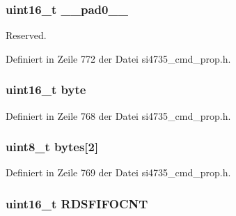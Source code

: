 \subsubsection[{\+\_\+\+\_\+pad0\+\_\+\+\_\+}]{\setlength{\rightskip}{0pt plus 5cm}uint16\+\_\+t \+\_\+\+\_\+pad0\+\_\+\+\_\+}\label{unionfm__rds__int__fifo__count_a77132c2c26a75f5b8751b235cda23828}


Reserved. 



Definiert in Zeile 772 der Datei si4735\+\_\+cmd\+\_\+prop.\+h.

\hypertarget{unionfm__rds__int__fifo__count_ab0549c1b5ea980a02e7eab77e21fea49}{}
\subsubsection[{byte}]{\setlength{\rightskip}{0pt plus 5cm}uint16\+\_\+t byte}\label{unionfm__rds__int__fifo__count_ab0549c1b5ea980a02e7eab77e21fea49}


Definiert in Zeile 768 der Datei si4735\+\_\+cmd\+\_\+prop.\+h.

\hypertarget{unionfm__rds__int__fifo__count_a46e4c05d20a047ec169f60d3167e912e}{}
\subsubsection[{bytes}]{\setlength{\rightskip}{0pt plus 5cm}uint8\+\_\+t bytes\mbox{[}2\mbox{]}}\label{unionfm__rds__int__fifo__count_a46e4c05d20a047ec169f60d3167e912e}


Definiert in Zeile 769 der Datei si4735\+\_\+cmd\+\_\+prop.\+h.

\hypertarget{unionfm__rds__int__fifo__count_a6273d3e5b093640f3492cb7eaad78cdc}{}
\subsubsection[{R\+D\+S\+F\+I\+F\+O\+C\+N\+T}]{\setlength{\rightskip}{0pt plus 5cm}uint16\+\_\+t R\+D\+S\+F\+I\+F\+O\+C\+N\+T}\label{unionfm__rds__int__fifo__count_a6273d3e5b093640f3492cb7eaad78cdc}


